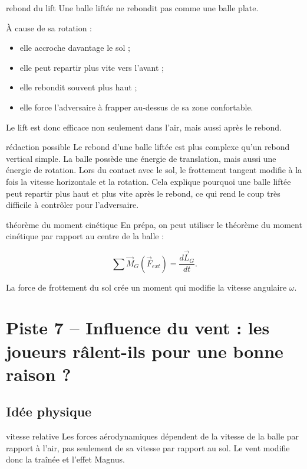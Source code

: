 \documentclass[11pt,a4paper]{article}
\begin{document}
\begin{tennis}{rebond du lift}
Une balle liftée ne rebondit pas comme une balle plate.

À cause de sa rotation :
\begin{itemize}
    \item elle accroche davantage le sol ;
    \item elle peut repartir plus vite vers l'avant ;
    \item elle rebondit souvent plus haut ;
    \item elle force l'adversaire à frapper au-dessus de sa zone confortable.
\end{itemize}

Le lift est donc efficace non seulement dans l'air, mais aussi après le rebond.
\end{tennis}

\begin{oral}{rédaction possible}
Le rebond d'une balle liftée est plus complexe qu'un rebond vertical simple. La balle possède une énergie de translation, mais aussi une énergie de rotation. Lors du contact avec le sol, le frottement tangent modifie à la fois la vitesse horizontale et la rotation. Cela explique pourquoi une balle liftée peut repartir plus haut et plus vite après le rebond, ce qui rend le coup très difficile à contrôler pour l'adversaire.
\end{oral}

\begin{prepa}{théorème du moment cinétique}
En prépa, on peut utiliser le théorème du moment cinétique par rapport au centre de la balle :

\[
\sum \vec{M}_G(\vec{F}_{ext})=\frac{d\vec{L}_G}{dt}.
\]

La force de frottement du sol crée un moment qui modifie la vitesse angulaire $\omega$.
\end{prepa}

\section{Piste 7 -- Influence du vent : les joueurs râlent-ils pour une bonne raison ?}

\subsection{Idée physique}

\begin{idee}{vitesse relative}
Les forces aérodynamiques dépendent de la vitesse de la balle par rapport à l'air, pas seulement de sa vitesse par rapport au sol. Le vent modifie donc la traînée et l'effet Magnus.
\end{idee}
\end{document}
